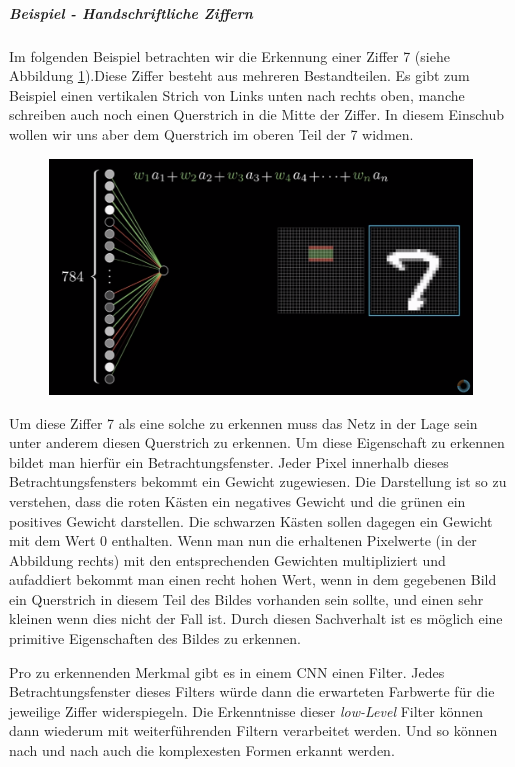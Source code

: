 \subparagraph{Beispiel - Handschriftliche Ziffern}
Im folgenden Beispiel betrachten wir die Erkennung einer Ziffer 7 (siehe Abbildung \ref{fig:cnn_filter}).Diese Ziffer besteht aus mehreren Bestandteilen. Es gibt zum Beispiel einen vertikalen Strich von Links unten nach rechts oben, manche schreiben auch noch einen Querstrich in die Mitte der Ziffer. In diesem Einschub wollen wir uns aber dem Querstrich im oberen Teil der 7 widmen. 

\begin{figure}[!htb]
	\centering
	\includegraphics[width=.7\linewidth]{img/filter}
	\label{fig:cnn_filter}
\end{figure}

Um diese Ziffer 7 als eine solche zu erkennen muss das Netz in der Lage sein unter anderem diesen Querstrich zu erkennen. Um diese Eigenschaft zu erkennen bildet man hierfür ein Betrachtungsfenster. Jeder Pixel innerhalb dieses Betrachtungsfensters bekommt ein Gewicht zugewiesen. Die Darstellung ist so zu verstehen, dass die roten Kästen ein negatives Gewicht und die grünen ein positives Gewicht darstellen. Die schwarzen Kästen sollen dagegen ein Gewicht mit dem Wert $0$ enthalten. Wenn man nun die erhaltenen Pixelwerte (in der Abbildung rechts) mit den entsprechenden Gewichten multipliziert und aufaddiert bekommt man einen recht hohen Wert, wenn in dem gegebenen Bild ein Querstrich in diesem Teil des Bildes vorhanden sein sollte, und einen sehr kleinen wenn dies nicht der Fall ist. Durch diesen Sachverhalt ist es möglich eine primitive Eigenschaften des Bildes zu erkennen.  

Pro zu erkennenden Merkmal gibt es in einem CNN einen Filter. Jedes Betrachtungsfenster dieses Filters würde dann die erwarteten Farbwerte für die jeweilige Ziffer widerspiegeln. Die Erkenntnisse dieser \emph{low-Level} Filter können dann wiederum mit weiterführenden Filtern verarbeitet werden. Und so können nach und nach auch die komplexesten Formen erkannt werden. 


